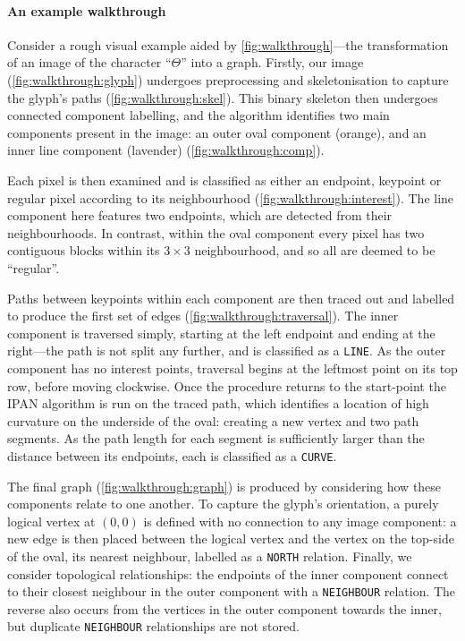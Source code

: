 \documentclass{mpaper}
\begin{document}
\paragraph{An example walkthrough}
Consider a rough visual example aided by \cref{fig:walkthrough}---the transformation of an image of the character ``$\Theta$'' into a graph.
Firstly, our image (\cref{fig:walkthrough:glyph}) undergoes preprocessing and skeletonisation to capture the glyph's paths (\cref{fig:walkthrough:skel}).
This binary skeleton then undergoes connected component labelling, and the algorithm  identifies two main components present in the image: an outer oval component (orange), and an inner line component (lavender) (\cref{fig:walkthrough:comp}).

Each pixel is then examined and is classified as either an endpoint, keypoint or regular pixel according to its neighbourhood (\cref{fig:walkthrough:interest}).
The line component here features two endpoints, which are detected from their neighbourhoods.
In contrast, within the oval component every pixel has two contiguous blocks within its $3\times3$ neighbourhood, and so all are deemed to be ``regular''.

Paths between keypoints within each component are then traced out and labelled to produce the first set of edges (\cref{fig:walkthrough:traversal}).
The inner component is traversed simply, starting at the left endpoint and ending at the right---the path is not split any further, and is classified as a \texttt{LINE}.
As the outer component has no interest points, traversal begins at the leftmost point on its top row, before moving clockwise.
Once the procedure returns to the start-point the IPAN algorithm is run on the traced path, which identifies a location of high curvature on the underside of the oval: creating a new vertex and two path segments.
As the path length for each segment is sufficiently larger than the distance between its endpoints, each is classified as a \texttt{CURVE}.

The final graph (\cref{fig:walkthrough:graph}) is produced by considering how these components relate to one another.
To capture the glyph's orientation, a purely logical vertex at $(0,0)$ is defined with no connection to any image component: a new edge is then placed between the logical vertex and the vertex on the top-side of the oval, its nearest neighbour, labelled as a \texttt{NORTH} relation.
Finally, we consider topological relationships: the endpoints of the inner component connect to their closest neighbour in the outer component with a \texttt{NEIGHBOUR} relation.
The reverse also occurs from the vertices in the outer component towards the inner, but duplicate \texttt{NEIGHBOUR} relationships are not stored.
\end{document}
